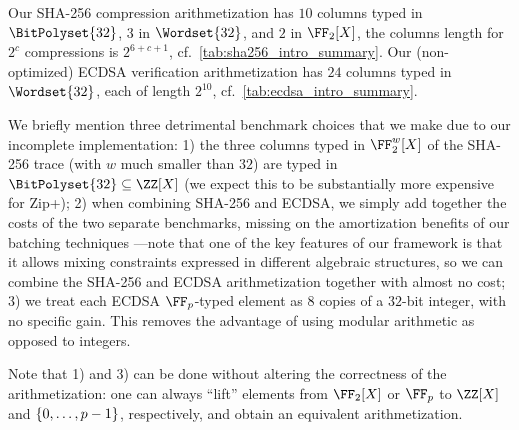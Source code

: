 Our SHA-256 compression arithmetization has $10$ columns typed in $\BitPolyset{32}$, $3$ in $\Wordset{32}$, and $2$ in $\FF_2[X]$, the columns length for $2^c$ compressions is $2^{6+c+1}$, cf.\ \cref{tab:sha256_intro_summary}. Our (non-optimized) ECDSA verification arithmetization has $24$ columns typed in $\Wordset{32}$, each of length $2^{10}$, cf.\ \cref{tab:ecdsa_intro_summary}.

\begin{remark}\label{rem:detrimental_choices}
  We briefly mention three detrimental benchmark choices that we make due to our incomplete implementation: 1) the three columns typed in $\FF_2^{w}[X]$ of the SHA-256 trace (with $w$ much smaller than $32$) are typed in $\BitPolyset{32}\subseteq \ZZ[X]$ (we expect this to be substantially more expensive for Zip+); 2) when combining SHA-256 and ECDSA, we simply add together the costs of the two separate benchmarks, missing on the amortization benefits of our batching techniques ---note that one of the key features of our framework is that it allows mixing constraints expressed in different algebraic structures, so we can combine the SHA-256 and ECDSA arithmetization together with almost no cost; 3) we treat each ECDSA $\FF_p$-typed element as $8$ copies of a $32$-bit integer, with no specific gain. This removes the advantage of using modular arithmetic as opposed to integers.  

  Note that 1) and 3) can be done without altering the correctness of the arithmetization: one can always ``lift'' elements from $\FF_2[X]$ or $\FF_p$ to $\ZZ[X]$ and $\range{0}{p-1}$, respectively, and obtain an equivalent arithmetization.
\end{remark}


